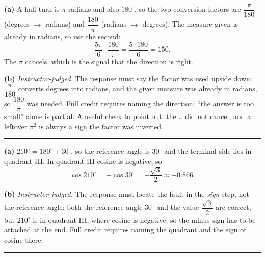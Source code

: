 \documentclass[12pt]{article}
\begin{document}



\textbf{(a)} A half turn is $\pi$ radians and also $180^\circ$, so the two conversion factors are $\dfrac{\pi}{180}$ (degrees $\to$ radians) and $\dfrac{180}{\pi}$ (radians $\to$ degrees). The measure given is already in radians, so use the second:
\[ \frac{5\pi}{6}\cdot\frac{180}{\pi} = \frac{5 \cdot 180}{6} = 150. \]
The $\pi$ cancels, which is the signal that the direction is right. 

\textbf{(b)} \emph{Instructor-judged.} The response must say the factor was used upside down: $\dfrac{\pi}{180}$ converts degrees into radians, and the given measure was already in radians, so $\dfrac{180}{\pi}$ was needed. Full credit requires naming the direction; ``the answer is too small'' alone is partial. A useful check to point out: the $\pi$ did not cancel, and a leftover $\pi^2$ is always a sign the factor was inverted.

\vspace{0.15cm}\noindent\rule{\linewidth}{0.2pt}\vspace{0.15cm}


\textbf{(a)} $210^\circ = 180^\circ + 30^\circ$, so the reference angle is $30^\circ$ and the terminal side lies in quadrant III. In quadrant III cosine is negative, so
\[ \cos 210^\circ = -\cos 30^\circ = -\frac{\sqrt{3}}{2} \approx -0.866. \]

\textbf{(b)} \emph{Instructor-judged.} The response must locate the fault in the \emph{sign} step, not the reference angle: both the reference angle $30^\circ$ and the value $\dfrac{\sqrt{3}}{2}$ are correct, but $210^\circ$ is in quadrant III, where cosine is negative, so the minus sign has to be attached at the end. Full credit requires naming the quadrant and the sign of cosine there.

\vspace{0.15cm}\noindent\rule{\linewidth}{0.2pt}\vspace{0.15cm}

\end{document}
